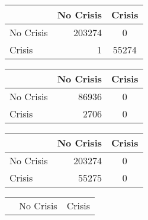 \begin{table}
    \begin{center}
        \begin{subtable}[c]{0.4\textwidth}
            \begin{tabular}{lrc}
                \hline
                 & No Crisis & Crisis \\
                \hline
                No Crisis & 203274   & 0 \\
                Crisis & 1 & 55274  \\
                \hline
            \end{tabular}
            \label{tab:mat-conf-bagg-train}
        \end{subtable}
        \hspace{1em}\vspace{1em}
        \begin{subtable}[c]{0.4\textwidth}
            \begin{tabular}{lrc}
                \hline
                 & No Crisis & Crisis \\
                \hline
                No Crisis & 86936 & 0 \\
                Crisis & 2706 & 0\\
                \hline
            \end{tabular}
            \label{tab:mat-conf-bagg-test}
        \end{subtable}
        \begin{subtable}[c]{0.4\textwidth}
            \begin{tabular}{lrc}
                \hline
                 & No Crisis & Crisis \\
                \hline
                No Crisis & 203274 & 0 \\
                Crisis & 55275 & 0\\
                \hline
            \end{tabular}
            \label{tab:mat-conf-ada-train}
        \end{subtable}
        \hspace{1em}\vspace{1em}
        \begin{subtable}[c]{0.4\textwidth}
            \begin{tabular}{lrc}
                \hline
                 & No Crisis & Crisis \\

\end{tabular}
\end{subtable}
\end{center}
\end{table}
